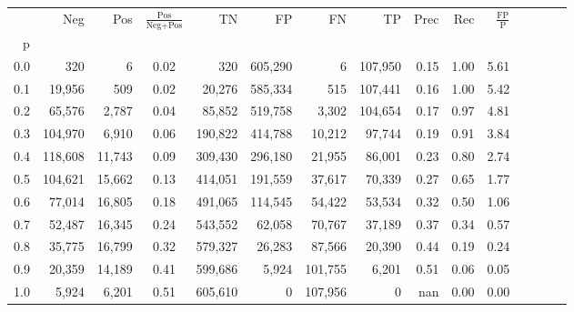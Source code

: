 \begin{tabular}{rrrcrrrrrrrrrrr}
\toprule
{} &      Neg &     Pos & $\frac{\text{Pos}}{\text{Neg}+\text{Pos}}$ &       TN &       FP &       FN &       TP &  Prec &   Rec & $\frac{\text{FP}}{\text{P}}$ \\
p   &          &         &                                            &          &          &          &          &       &       &                              \\
\midrule
0.0 &      320 &       6 &                                       0.02 &      320 &  605,290 &        6 &  107,950 &  0.15 &  1.00 &                         5.61 \\
0.1 &   19,956 &     509 &                                       0.02 &   20,276 &  585,334 &      515 &  107,441 &  0.16 &  1.00 &                         5.42 \\
0.2 &   65,576 &   2,787 &                                       0.04 &   85,852 &  519,758 &    3,302 &  104,654 &  0.17 &  0.97 &                         4.81 \\
0.3 &  104,970 &   6,910 &                                       0.06 &  190,822 &  414,788 &   10,212 &   97,744 &  0.19 &  0.91 &                         3.84 \\
0.4 &  118,608 &  11,743 &                                       0.09 &  309,430 &  296,180 &   21,955 &   86,001 &  0.23 &  0.80 &                         2.74 \\
0.5 &  104,621 &  15,662 &                                       0.13 &  414,051 &  191,559 &   37,617 &   70,339 &  0.27 &  0.65 &                         1.77 \\
0.6 &   77,014 &  16,805 &                                       0.18 &  491,065 &  114,545 &   54,422 &   53,534 &  0.32 &  0.50 &                         1.06 \\
0.7 &   52,487 &  16,345 &                                       0.24 &  543,552 &   62,058 &   70,767 &   37,189 &  0.37 &  0.34 &                         0.57 \\
0.8 &   35,775 &  16,799 &                                       0.32 &  579,327 &   26,283 &   87,566 &   20,390 &  0.44 &  0.19 &                         0.24 \\
0.9 &   20,359 &  14,189 &                                       0.41 &  599,686 &    5,924 &  101,755 &    6,201 &  0.51 &  0.06 &                         0.05 \\
1.0 &    5,924 &   6,201 &                                       0.51 &  605,610 &        0 &  107,956 &        0 &   nan &  0.00 &                         0.00 \\
\bottomrule
\end{tabular}
